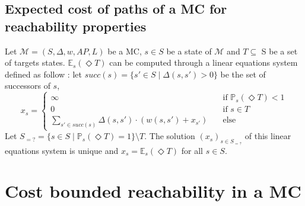\subsection{Expected cost of paths of a MC for reachability properties}\label{app-expMC}
  Let $\mathcal{M} = (S, \Delta, w, AP, L)$ be a MC, $s \in S$ be a state of $\mathcal{M}$ and $T \subseteq$ S be a set of targets states. $\mathbb{E}_s(\Diamond T)$ can be computed through a linear equations system defined as follow :
  let $succ(s) = \{ s' \in S \; | \; \Delta(s, s') > 0 \}$ be the set of successors of $s$,
  \[ x_s =
  	\begin{cases}
  	\infty & \quad \text{if } \mathbb{P}_s(\Diamond T) < 1 \\
  	0 & \quad \text{if } s \in T \\
  	\sum_{s' \in succ(s)} \Delta(s, s') \cdot (w(s, s') + x_{s'}) & \quad \text{else}
  	\end{cases}
  \]
Let $S_{=?} = \{ s \in S \; | \; \mathbb{P}_s(\Diamond T) = 1 \} \setminus T$. The solution $(x_s)_{s \in S_{=?}}$ of this linear equations system is unique and $x_s = \mathbb{E}_s(\Diamond T)$ for all $s \in S$.

\section{Cost bounded reachability in a MC}\label{app-cbrMC}

